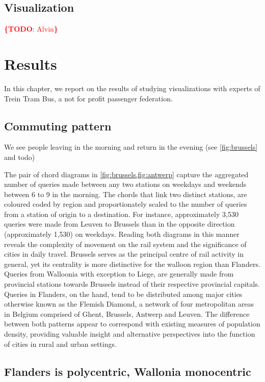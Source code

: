 \documentclass{sig-alternate}
\newcommand{\todo}[1]{\noindent\textcolor{red}{{\bf \{TODO}: #1{\bf \}}}}
\begin{document}
\subsection{Visualization}

\todo{Alvin} 

\section{Results}
\label{sec:results}

In this chapter, we report on the results of studying visualizations with experts of Trein Tram Bus, a not for profit passenger federation.

\subsection{Commuting pattern}

We see people leaving in the morning and return in the evening (see \cref{fig:brussels} and todo)

The pair of chord diagrams in \cref{fig:brussels,fig:antwerp} capture the aggregated number of queries made between any two stations on weekdays and weekends between 6 to 9 in the morning.
The chords that link two distinct stations, are coloured coded by region and proportionately scaled to the number of queries from a station of origin to a destination.
For instance, approximately 3,530 queries were made from Leuven to Brussels than in the opposite direction (approximately 1,530) on weekdays.
Reading both diagrams in this manner reveals the complexity of movement on the rail system and the significance of cities in daily travel.
Brussels serves as the principal centre of rail activity in general, yet its centrality is more distinctive for the walloon region than Flanders.
Queries from Walloonia with exception to Liege, are generally made from provincial stations towards Brussels instead of their respective provincial capitals.
Queries in Flanders, on the hand, tend to be distributed among major cities otherwise known as the Flemish Diamond, a network of four metropolitan areas in Belgium comprised of Ghent, Brussels, Antwerp and Leuven.
The difference between both patterns appear to correspond with existing measures of population density, providing valuable insight and alternative perspectives into the function of cities in rural and urban settings.

\subsection{Flanders is polycentric, Wallonia monocentric}
\end{document}
